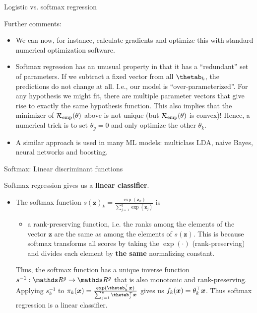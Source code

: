 \begin{vbframe}{Logistic vs. softmax regression}

Further comments:

\begin{itemize}

\item We can now, for instance, calculate gradients and optimize this with standard numerical optimization software.


\item Softmax regression has an unusual property in that it has a \enquote{redundant} set of parameters. If we subtract a fixed vector
  from all $\thetab_k$, the predictions do not change at all.
  I.e.,  our model is \enquote{over-parameterized}. For any hypothesis we might fit,
  there are multiple parameter vectors that give rise to exactly the same hypothesis function.
  This also implies that the minimizer of $\mathcal{R}_{\text{emp}}(\theta)$ above is not unique (but $\mathcal{R}_{\text{emp}}(\theta)$ is convex)!
  Hence, a numerical trick is to set $\theta_g = 0$ and only optimize the other $\theta_k$.

\item A similar approach is used in many ML models: multiclass LDA, naive Bayes, neural networks and boosting.

\end{itemize}

\end{vbframe} 

\begin{vbframe}{Softmax: Linear discriminant functions}

Softmax regression gives us a \textbf{linear classifier}. 

\begin{itemize}
  \item The softmax function $s(\bm{z})_k = \frac{\exp(\bm{z}_k)}{\sum_{j = 1}^g \exp \left(\bm{z}_j\right)}$ is 

\begin{itemize}
  \item a rank-preserving function, i.e. the ranks among the elements of the vector $\bm{z}$ are the same as among the elements of $s(\bm{z})$. This is because softmax transforms all scores by taking the $\exp(\cdot)$ (rank-preserving) and divides each element by \textbf{the same} normalizing constant. 
\end{itemize}

Thus, the softmax function has a unique inverse function $s^{-1}: \R^g \to \R^g$ that is also monotonic and rank-preserving. Applying $s_k^{-1}$ to $\pi_k(\xv) = \frac{\exp(\thetab_k^\top \xv)}{\sum_{j = 1}^n \thetab_j^\top \xv}$ gives us $f_k(\bm{x}) = \theta_k^\top \bm{x}$. Thus softmax regression is a linear classifier. 
\end{itemize}

\end{vbframe}

